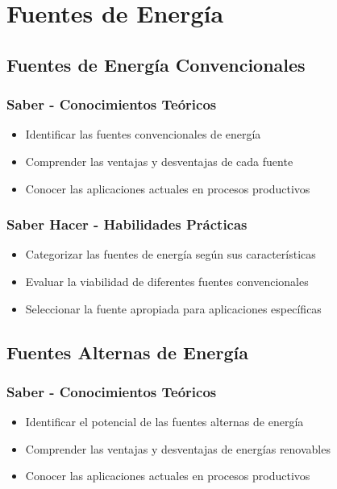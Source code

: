\documentclass[12pt,a4paper,twoside]{book}
\begin{document}
	\chapter{Fuentes de Energía}
	\label{chap:fuentes_energia}
	
	\section{Fuentes de Energía Convencionales}
	\label{sec:energia_convencional}
	
	\subsection{Saber - Conocimientos Teóricos}
	\begin{saberbox}
		\begin{itemize}
			\item Identificar las fuentes convencionales de energía
			\item Comprender las ventajas y desventajas de cada fuente
			\item Conocer las aplicaciones actuales en procesos productivos
		\end{itemize}
	\end{saberbox}
	
	\subsection{Saber Hacer - Habilidades Prácticas}
	\begin{hacerbox}
		\begin{itemize}
			\item Categorizar las fuentes de energía según sus características
			\item Evaluar la viabilidad de diferentes fuentes convencionales
			\item Seleccionar la fuente apropiada para aplicaciones específicas
		\end{itemize}
	\end{hacerbox}
	
	\section{Fuentes Alternas de Energía}
	\label{sec:energia_alterna}
	
	\subsection{Saber - Conocimientos Teóricos}
	\begin{saberbox}
		\begin{itemize}
			\item Identificar el potencial de las fuentes alternas de energía
			\item Comprender las ventajas y desventajas de energías renovables
			\item Conocer las aplicaciones actuales en procesos productivos
		\end{itemize}
	\end{saberbox}
	
\end{document}
